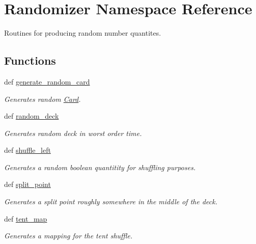 \hypertarget{namespaceRandomizer}{\section{Randomizer Namespace Reference}
\label{namespaceRandomizer}
}


Routines for producing random number quantites.  


\subsection*{Functions}
\begin{DoxyCompactItemize}
\item 
\hypertarget{namespaceRandomizer_a70d2fb0c71a9c11e0faaee4151eb629b}{def \hyperlink{namespaceRandomizer_a70d2fb0c71a9c11e0faaee4151eb629b}{generate\-\_\-random\-\_\-card}}\label{namespaceRandomizer_a70d2fb0c71a9c11e0faaee4151eb629b}

\begin{DoxyCompactList}\small\item\em Generates random \hyperlink{namespaceCard}{Card}. \end{DoxyCompactList}\item 
\hypertarget{namespaceRandomizer_a0806d8920dbb1379ddc71297f1af5e9b}{def \hyperlink{namespaceRandomizer_a0806d8920dbb1379ddc71297f1af5e9b}{random\-\_\-deck}}\label{namespaceRandomizer_a0806d8920dbb1379ddc71297f1af5e9b}

\begin{DoxyCompactList}\small\item\em Generates random deck in worst order time. \end{DoxyCompactList}\item 
def \hyperlink{namespaceRandomizer_afc3116d438646490c8819d110cd49e9f}{shuffle\-\_\-left}
\begin{DoxyCompactList}\small\item\em Generates a random boolean quantitity for shuffling purposes. \end{DoxyCompactList}\item 
def \hyperlink{namespaceRandomizer_a6806eb61b64879174ebcf921a248830d}{split\-\_\-point}
\begin{DoxyCompactList}\small\item\em Generates a split point roughly somewhere in the middle of the deck. \end{DoxyCompactList}\item 
\hypertarget{namespaceRandomizer_a97ea47f855d80924c3c645c3fe4a1f8e}{def \hyperlink{namespaceRandomizer_a97ea47f855d80924c3c645c3fe4a1f8e}{tent\-\_\-map}}\label{namespaceRandomizer_a97ea47f855d80924c3c645c3fe4a1f8e}

\begin{DoxyCompactList}\small\item\em Generates a mapping for the tent shuffle. \end{DoxyCompactList}\end{DoxyCompactItemize}


